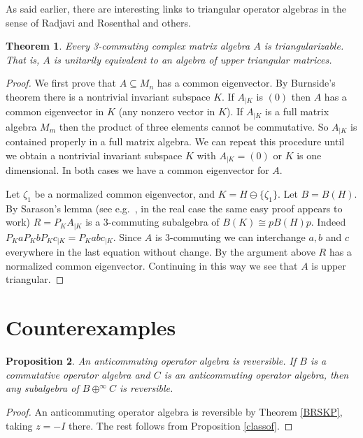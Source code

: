 \documentclass{amsart}
\newtheorem{theorem}{Theorem}[section]
\newtheorem{proposition}[theorem]{Proposition}
\theoremstyle{remark}
\theoremstyle{definition}
\numberwithin{equation}{section}
\begin{document}
\medskip

As said earlier, there are interesting links to triangular operator algebras in the sense of Radjavi and Rosenthal \cite{RR} and others. 

\begin{theorem} \label{Burn} Every 3-commuting complex matrix algebra $A$ is  triangularizable.   That is, $A$  is unitarily equivalent to an algebra of upper triangular matrices. \end{theorem}  

\begin{proof}   We first prove 
that  $A \subseteq M_n$  has a common  eigenvector.
By Burnside's theorem \cite{Lam}
there is a nontrivial invariant subspace $K$.    
If $A_{|K}$ is $(0)$ then $A$ has a  common eigenvector in $K$ (any nonzero vector in $K$).
  If $A_{|K}$ is a full matrix algebra $M_m$ then the product of three elements cannot be commutative.
  So $A_{|K}$ is contained properly in a full matrix algebra.   We can repeat this procedure until we obtain a nontrivial invariant subspace
$K$ with $A_{|K} = (0)$ or  $K$ is one dimensional.  In both cases we have a common  eigenvector for $A$. 

Let $\zeta_1$ be a normalized common eigenvector, and $K = H \ominus \{ \zeta_1 \}$. Let $B = B(H)$.  By Sarason's lemma (see e.g.\ \cite[Proposition 3.2.2]{BLM}, in the real case the same easy proof appears to work) 
$R = P_K A _{|K}$ is a 3-commuting subalgebra of $B(K) \cong p B(H) p$.   
Indeed $P_K a P_K b P_K c_{|K}  = P_K abc_{|K}$.   Since $A$ is 3-commuting we can interchange $a,b$ and $c$ everywhere in the last equation without change.   By the argument above 
$R$ has  a normalized common eigenvector.  
Continuing in this way we see that $A$ is  upper triangular.
\end{proof}


\section{Counterexamples} \label{kegs}  

\begin{proposition} \label{acre} An anticommuting operator algebra is reversible.  If $B$ is a commutative operator algebra and 
$C$ is an anticommuting operator algebra, then any subalgebra of $B \oplus^\infty C$  is reversible. 
\end{proposition}  
\begin{proof}   An anticommuting operator algebra is reversible by Theorem \ref{BRSKP}, taking $z = -I$ there.   The rest follows from Proposition \ref{classof}. 
\end{proof}
\end{document}
